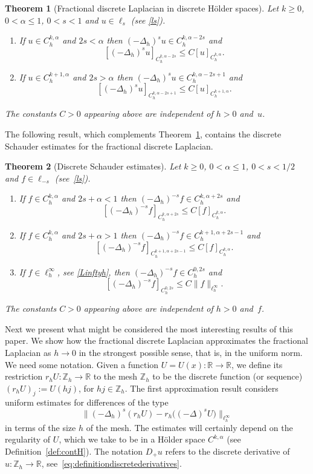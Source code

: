 \documentclass[a4paper,11pt,reqno]{amsart}
\newcommand{\R}{\mathbb{R}}
\newcommand{\Z}{\mathbb{Z}}
\newtheorem{thm}{Theorem}[section]
\theoremstyle{definition}
\numberwithin{equation}{section}
\begin{document}
\begin{thm}[Fractional discrete Laplacian in discrete H\"older spaces]
\label{thm:Holder}
Let $k\geq0$, $0<\alpha\le1$, $0<s<1$ and $u\in\ell_s$ (see \eqref{ls}).
\begin{enumerate}[$(i)$]
\item \label{(i)} If $u\in C^{k,\alpha}_h$ and $2s<\alpha$ then
$(-\Delta_h)^su\in C^{k,\alpha-2s}_h$ and
$$
[(-\Delta_h)^su]_{C^{k,\alpha-2s}_h}\leq C[u]_{C^{k,\alpha}_h}.
$$
\item \label{(iii)} If $u\in C^{k+1,\alpha}_h$ and $2s>\alpha$ then
$(-\Delta_h)^su\in C^{k,\alpha-2s+1}_h$ and
$$
[(-\Delta_h)^su]_{C^{k,\alpha-2s+1}_h}\leq C[u]_{C^{k+1,\alpha}_h}.
$$
\end{enumerate}
The constants $C>0$ appearing above are independent of $h>0$ and~$u$.
\end{thm}

The following result, which complements Theorem~\ref{thm:Holder},
contains the discrete Schauder estimates for the fractional discrete Laplacian.

\begin{thm}[Discrete Schauder estimates]
\label{RegularityfractionalIntegral}
Let $k\geq0$, $0<\alpha\leq1$, $0<s<1/2$ and $f\in \ell_{-s}$ (see~\eqref{ls}).
\begin{enumerate}[$(i)$]
\item If $f\in C_h^{k, \alpha} $ and $2s+\alpha <1$ then $(-\Delta_h)^{-s} f \in C^{k, \alpha+2s}_h$ and
$$
[ (-\Delta_h)^{-s} f ]_{C_h^{k,\alpha+2s}} \le C [ f]_{C_h^{k,\alpha}}.
$$
\item If $f\in C_h^{k, \alpha}$ and $2s+\alpha >1$ then $(-\Delta_h)^{-s} f \in C_h^{k+1, \alpha+2s-1}$ and
$$
[ (-\Delta_h)^{-s} f ]_{C_h^{k+1,\alpha+2s-1}} \le C [ f]_{C_h^{k,\alpha}}.
$$
\item If $f\in \ell^\infty_h$, see \eqref{Linftyh}, then $(-\Delta_h)^{-s} f \in C^{0,2s}_h$ and
$$
[ (-\Delta_h)^{-s} f ]_{C_h^{0,2s}} \le C \|f\|_{\ell^\infty_h}.
$$
\end{enumerate}
The constants $C>0$ appearing above are independent of $h>0$ and~$f$.
\end{thm}

Next we present what might be considered the most interesting results of this paper.
We show how the fractional discrete Laplacian approximates
the fractional Laplacian as $h\to0$ in the strongest possible sense, that is, in the uniform norm.
We need some notation.
Given a function $U=U(x):\R\to\R$, we define its restriction $r_hU:\Z_h\to\R$
to the mesh $\Z_h$ to be the discrete function (or sequence) $(r_hU)_j:=U(hj)$, for $hj\in\Z_h$.
The first approximation result considers uniform estimates for differences of the type
\[
\big\|(-\Delta_h)^s(r_hU)-r_h \big((-\Delta)^s U\big) \big\|_{\ell^\infty_h}
\]
in terms of the size $h$ of the mesh.
The estimates will certainly depend on the regularity of $U$,
which we take to be in a H\"older space $C^{k,\alpha}$
(see Definition~\ref{def:contH}).
The notation $D_+u$ refers to the discrete derivative of $u:\Z_h\to\R$,
see~\eqref{eq:definitiondiscretederivatives}.
\end{document}
